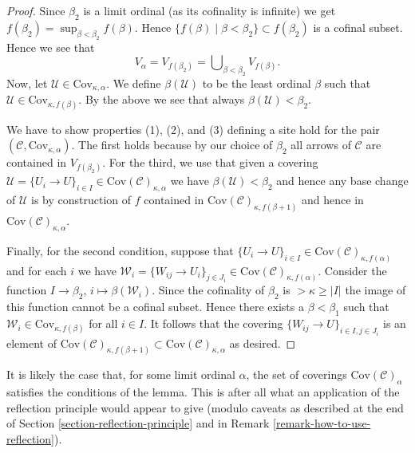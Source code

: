 \begin{proof}
\medskip\noindent
Since $\beta_2$ is a limit ordinal (as its cofinality is infinite)
we get $f(\beta_2) = \sup_{\beta < \beta_2} f(\beta)$.
Hence $\{f(\beta) \mid \beta < \beta_2\} \subset f(\beta_2)$ is a
cofinal subset. Hence we see that
$$
V_\alpha = V_{f(\beta_2)} = \bigcup\nolimits_{\beta < \beta_2} V_{f(\beta)}.
$$
Now, let $\mathcal{U} \in \text{Cov}_{\kappa, \alpha}$.
We define $\beta(\mathcal{U})$ to be the least ordinal $\beta$ such that
$\mathcal{U} \in \text{Cov}_{\kappa, f(\beta)}$. By the above we see
that always $\beta(\mathcal{U}) < \beta_2$.

\medskip\noindent
We have to show properties (1), (2), and (3) defining a site
hold for the pair $(\mathcal{C}, \text{Cov}_{\kappa, \alpha})$.
The first holds because by our choice of $\beta_2$
all arrows of $\mathcal{C}$ are contained in $V_{f(\beta_2)}$.
For the third, we use that given a covering
$\mathcal{U} = \{U_i \to U\}_{i \in I}
\in \text{Cov}(\mathcal{C})_{\kappa, \alpha}$
we have $\beta(\mathcal{U}) < \beta_2$ and hence
any base change of $\mathcal{U}$ is by construction of
$f$ contained in $\text{Cov}(\mathcal{C})_{\kappa, f(\beta + 1)}$
and hence in $\text{Cov}(\mathcal{C})_{\kappa, \alpha}$.

\medskip\noindent
Finally, for the second condition, suppose that $\{U_i \to U\}_{i\in I}
\in \text{Cov}(\mathcal{C})_{\kappa, f(\alpha)}$
and for each $i$ we have
$\mathcal{W}_i = \{W_{ij} \to U_i\}_{j\in J_i}
\in \text{Cov}(\mathcal{C})_{\kappa, f(\alpha)}$.
Consider the function
$I \to \beta_2$, $i \mapsto \beta(\mathcal{W}_i)$. Since the cofinality
of $\beta_2$ is $> \kappa \geq |I|$ the image of this function cannot be a
cofinal subset. Hence there exists a $\beta < \beta_1$ such
that $\mathcal{W}_i \in \text{Cov}_{\kappa, f(\beta)}$ for all $i \in I$.
It follows that the covering $\{W_{ij} \to U\}_{i\in I, j \in J_i}$
is an element of $\text{Cov}(\mathcal{C})_{\kappa, f(\beta + 1)}
\subset \text{Cov}(\mathcal{C})_{\kappa, \alpha}$ as desired.
\end{proof}

\begin{remark}
\label{remark-better}
It is likely the case that, for some limit ordinal $\alpha$,
the set of coverings $\text{Cov}(\mathcal{C})_\alpha$ satisfies
the conditions of the lemma. This is after all what an application
of the reflection principle would appear to give (modulo caveats as
described at the end of Section \ref{section-reflection-principle}
and in Remark \ref{remark-how-to-use-reflection}).
\end{remark}








